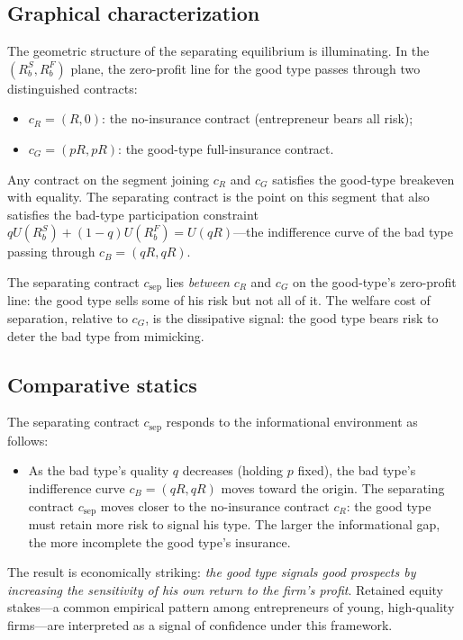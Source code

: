 \documentclass[11pt,a4paper,oneside]{book}
\theoremstyle{plain}
\theoremstyle{definition}
\theoremstyle{remark}
\numberwithin{equation}{chapter}
\begin{document}
\subsection{Graphical characterization}

The geometric structure of the separating equilibrium is illuminating.
In the $(R_b^S, R_b^F)$ plane, the zero-profit line for the good type passes through two distinguished contracts:
\begin{itemize}
  \item $c_R = (R, 0)$: the no-insurance contract (entrepreneur bears all risk);
  \item $c_G = (pR, pR)$: the good-type full-insurance contract.
\end{itemize}
Any contract on the segment joining $c_R$ and $c_G$ satisfies the good-type breakeven with equality.
The separating contract is the point on this segment that also satisfies the bad-type participation constraint $q U(R_b^S) + (1 - q) U(R_b^F) = U(qR)$---the indifference curve of the bad type passing through $c_B = (qR, qR)$.

The separating contract $c_{\text{sep}}$ lies \emph{between} $c_R$ and $c_G$ on the good-type's zero-profit line: the good type sells some of his risk but not all of it.
The welfare cost of separation, relative to $c_G$, is the dissipative signal: the good type bears risk to deter the bad type from mimicking.

\subsection{Comparative statics}

The separating contract $c_{\text{sep}}$ responds to the informational environment as follows:

\begin{itemize}
  \item As the bad type's quality $q$ decreases (holding $p$ fixed), the bad type's indifference curve $c_B = (qR, qR)$ moves toward the origin.
  The separating contract $c_{\text{sep}}$ moves closer to the no-insurance contract $c_R$: the good type must retain more risk to signal his type.
  The larger the informational gap, the more incomplete the good type's insurance.
\end{itemize}

The result is economically striking: \emph{the good type signals good prospects by increasing the sensitivity of his own return to the firm's profit}.
Retained equity stakes---a common empirical pattern among entrepreneurs of young, high-quality firms---are interpreted as a signal of confidence under this framework.
\end{document}
